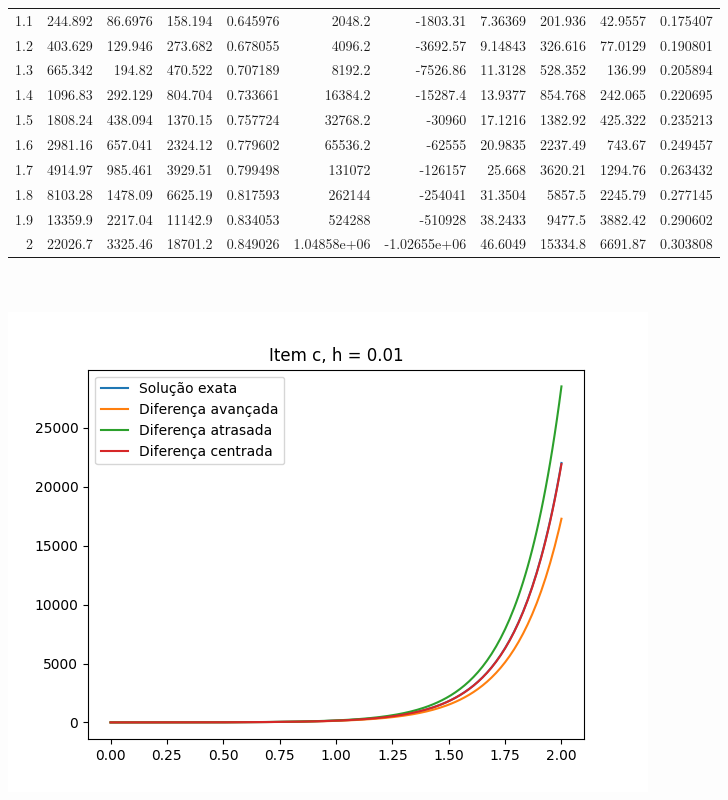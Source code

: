 {\begin{tabular}{rrrrrrrrrrr}
 1.1 &   244.892   &   86.6976  &    158.194    &     0.645976  &   2048.2         &   -1803.31        &      7.36369  &   201.936   &    42.9557    &     0.175407  \\
 1.2 &   403.629   &  129.946   &    273.682    &     0.678055  &   4096.2         &   -3692.57        &      9.14843  &   326.616   &    77.0129    &     0.190801  \\
 1.3 &   665.342   &  194.82    &    470.522    &     0.707189  &   8192.2         &   -7526.86        &     11.3128   &   528.352   &   136.99      &     0.205894  \\
 1.4 &  1096.83    &  292.129   &    804.704    &     0.733661  &  16384.2         &  -15287.4         &     13.9377   &   854.768   &   242.065     &     0.220695  \\
 1.5 &  1808.24    &  438.094   &   1370.15     &     0.757724  &  32768.2         &  -30960           &     17.1216   &  1382.92    &   425.322     &     0.235213  \\
 1.6 &  2981.16    &  657.041   &   2324.12     &     0.779602  &  65536.2         &  -62555           &     20.9835   &  2237.49    &   743.67      &     0.249457  \\
 1.7 &  4914.97    &  985.461   &   3929.51     &     0.799498  & 131072           & -126157           &     25.668    &  3620.21    &  1294.76      &     0.263432  \\
 1.8 &  8103.28    & 1478.09    &   6625.19     &     0.817593  & 262144           & -254041           &     31.3504   &  5857.5     &  2245.79      &     0.277145  \\
 1.9 & 13359.9     & 2217.04    &  11142.9      &     0.834053  & 524288           & -510928           &     38.2433   &  9477.5     &  3882.42      &     0.290602  \\
 2   & 22026.7     & 3325.46    &  18701.2      &     0.849026  &      1.04858e+06 &      -1.02655e+06 &     46.6049   & 15334.8     &  6691.87      &     0.303808  \\
\hline
\end{tabular}
}
        \\
        \\
        \includegraphics{c_h_0.01.png}

